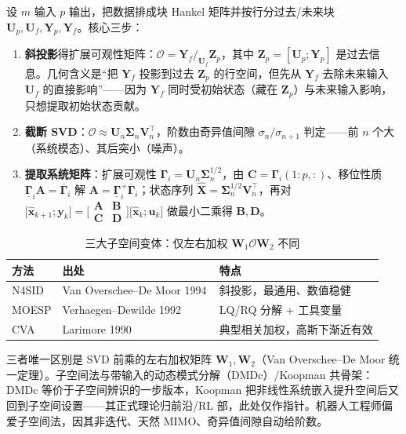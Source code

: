设 $m$ 输入 $p$ 输出，把数据排成块 Hankel 矩阵并按行分过去/未来块 $\mathbf U_p,\mathbf U_f,\mathbf Y_p,\mathbf Y_f$。核心三步：
\begin{enumerate}
  \item \textbf{斜投影}得扩展可观性矩阵：$\mathcal O=\mathbf Y_f/_{\mathbf U_f}\mathbf Z_p$，其中 $\mathbf Z_p=[\mathbf U_p;\mathbf Y_p]$ 是过去信息。几何含义是“把 $\mathbf Y_f$ 投影到过去 $\mathbf Z_p$ 的行空间，但先从 $\mathbf Y_f$ 去除未来输入 $\mathbf U_f$ 的直接影响”——因为 $\mathbf Y_f$ 同时受初始状态（藏在 $\mathbf Z_p$）与未来输入影响，只想提取初始状态贡献。
  \item \textbf{截断 SVD}：$\mathcal O\approx\mathbf U_n\boldsymbol\Sigma_n\mathbf V_n^\top$，阶数由奇异值间隙 $\sigma_n/\sigma_{n+1}$ 判定——前 $n$ 个大（系统模态）、其后突小（噪声）。
  \item \textbf{提取系统矩阵}：扩展可观性 $\boldsymbol\Gamma_i=\mathbf U_n\boldsymbol\Sigma_n^{1/2}$，由 $\mathbf C=\boldsymbol\Gamma_i(1{:}p,:)$、移位性质 $\underline{\boldsymbol\Gamma}_i\mathbf A=\overline{\boldsymbol\Gamma}_i$ 解 $\mathbf A=\underline{\boldsymbol\Gamma}_i^+\overline{\boldsymbol\Gamma}_i$；状态序列 $\hat{\mathbf X}=\boldsymbol\Sigma_n^{1/2}\mathbf V_n^\top$，再对 $\big[\hat{\mathbf x}_{k+1};\mathbf y_k\big]=\big[\begin{smallmatrix}\mathbf A&\mathbf B\\\mathbf C&\mathbf D\end{smallmatrix}\big]\big[\hat{\mathbf x}_k;\mathbf u_k\big]$ 做最小二乘得 $\mathbf B,\mathbf D$。
\end{enumerate}

\begin{table}[H]\centering\small
\caption{三大子空间变体：仅左右加权 $\mathbf W_1\mathcal O\mathbf W_2$ 不同}
\label{tab:subspace}
\begin{tabular}{lll}
\toprule
方法 & 出处 & 特点 \\
\midrule
N4SID & Van Overschee--De Moor 1994\,\cite{vanoverschee1994n4sid} & 斜投影，最通用、数值稳健 \\
MOESP & Verhaegen--Dewilde 1992\,\cite{verhaegen1992moesp} & LQ/RQ 分解 + 工具变量 \\
CVA & Larimore 1990\,\cite{larimore1990cva} & 典型相关加权，高斯下渐近有效 \\
\bottomrule
\end{tabular}
\end{table}

三者唯一区别是 SVD 前乘的左右加权矩阵 $\mathbf W_1,\mathbf W_2$（Van Overschee--De Moor 统一定理）。子空间法与带输入的动态模式分解（DMDc）/Koopman 共骨架：DMDc 等价于子空间辨识的一步版本，Koopman 把非线性系统嵌入提升空间后又回到子空间设置——其正式理论归前沿/RL 部，此处仅作指针。机器人工程师偏爱子空间法，因其非迭代、天然 MIMO、奇异值间隙自动给阶数。

